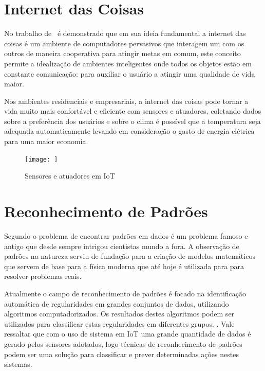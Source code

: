 \section{Internet das Coisas}

No trabalho de~ é demonstrado que em sua ideia fundamental a internet das coisas é um ambiente de computadores pervasivos que interagem um com os outros de maneira cooperativa para atingir metas em comum, este conceito permite a idealização de ambientes inteligentes onde todos os objetos estão em constante comunicação: para auxiliar o usuário a atingir uma qualidade de vida maior.

Nos ambientes residenciais e empresariais, a internet das coisas pode tornar a vida muito mais confortável e eficiente com sensores e atuadores, coletando dados sobre a preferência dos usuários e sobre o clima é possível que a temperatura seja adequada automaticamente levando em consideração o gasto de energia elétrica para uma maior economia. \cite{ATZORI:2010}


\begin{figure}
    \centering
    \texttt{[image: ]}
    \caption{Sensores e atuadores em IoT}
    \label{fig:my_label}
\end{figure}


\section{Reconhecimento de Padrões}

Segundo  o problema de encontrar padrões em dados é um problema famoso e antigo que desde sempre intrigou cientistas mundo a fora. A observação de padrões na natureza serviu de fundação para a criação de modelos matemáticos que servem de base para a física moderna que até hoje é utilizada para para resolver problemas reais. 

Atualmente o campo de reconhecimento de padrões é focado na identificação automática de regularidades em grandes conjuntos de dados, utilizando algoritmos computadorizados. Os resultados destes algoritmos podem ser utilizados para classificar estas regularidades em diferentes grupos. \cite{bishop:2006}. Vale ressaltar que com o uso de sistema em IoT uma grande quantidade de dados é gerado pelos sensores adotados, logo técnicas de reconhecimento de padrões podem ser uma solução para classificar e prever determinadas ações nestes sistemas.

